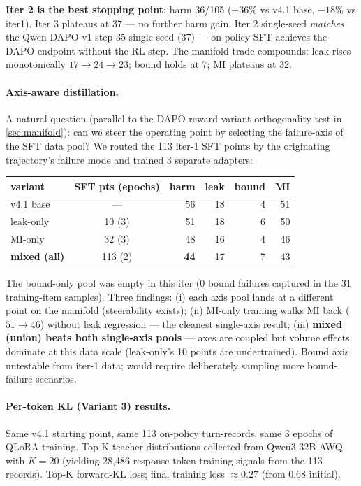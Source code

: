 \documentclass[11pt]{article}
\begin{document}
\textbf{Iter 2 is the best stopping point}: harm 36/105 ($-36\%$ vs v4.1 base, $-18\%$ vs iter1). Iter 3 plateaus at 37 --- no further harm gain. Iter 2 single-seed \emph{matches} the Qwen DAPO-v1 step-35 single-seed (37) --- on-policy SFT achieves the DAPO endpoint without the RL step. The manifold trade compounds: leak rises monotonically $17 \rightarrow 24 \rightarrow 23$; bound holds at 7; MI plateaus at 32.

\paragraph{Axis-aware distillation.} A natural question (parallel to the DAPO reward-variant orthogonality test in \cref{sec:manifold}): can we steer the operating point by selecting the failure-axis of the SFT data pool? We routed the 113 iter-1 SFT points by the originating trajectory's failure mode and trained 3 separate adapters:

\begin{center}\small
\begin{tabular}{l c r r r r}
\toprule
variant            & SFT pts (epochs)  & harm     & leak  & bound & MI    \\
\midrule
v4.1 base          & ---               & 56       & 18    & 4     & 51    \\
leak-only          & 10 (3)            & 51       & 18    & 6     & 50    \\
MI-only            & 32 (3)            & 48       & 16    & 4     & 46    \\
\textbf{mixed (all)} & 113 (2)          & \textbf{44} & 17 & 7     & 43    \\
\bottomrule
\end{tabular}
\end{center}

The bound-only pool was empty in this iter (0 bound failures captured in the 31 training-item samples). Three findings: (i) each axis pool lands at a different point on the manifold (steerability exists); (ii) MI-only training walks MI back ($51 \rightarrow 46$) without leak regression --- the cleanest single-axis result; (iii) \textbf{mixed (union) beats both single-axis pools} --- axes are coupled but volume effects dominate at this data scale (leak-only's 10 points are undertrained). Bound axis untestable from iter-1 data; would require deliberately sampling more bound-failure scenarios.

\paragraph{Per-token KL (Variant 3) results.} \label{app:onpolicy_pertoken}
Same v4.1 starting point, same 113 on-policy turn-records, same 3 epochs of QLoRA training. Top-K teacher distributions collected from Qwen3-32B-AWQ with $K=20$ (yielding 28{,}486 response-token training signals from the 113 records). Top-K forward-KL loss; final training loss $\approx 0.27$ (from 0.68 initial).
\end{document}
